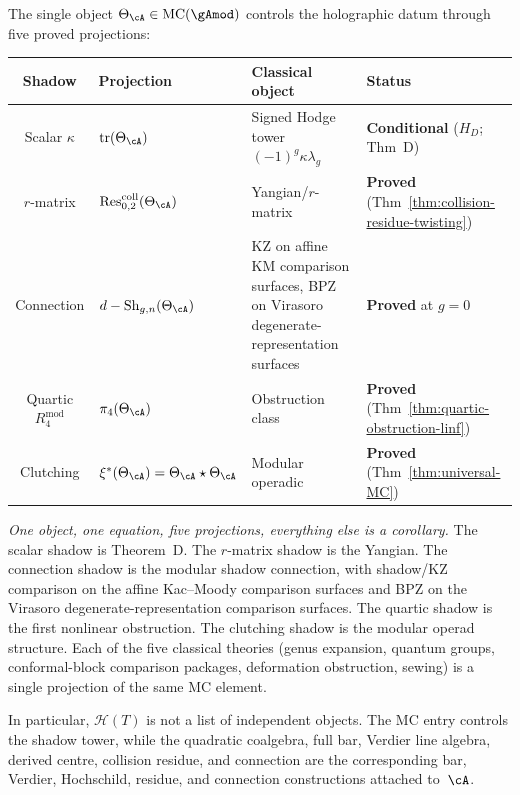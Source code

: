 \begin{remark}

\label{rem:five-shadows-synthesis}
The single object $\Theta_\cA \in \mathrm{MC}(\gAmod)$ controls the
holographic datum through five proved projections:
\begin{center}
\renewcommand{\arraystretch}{1.3}
\begin{tabular}{@{}clll@{}}
\toprule
\textbf{Shadow} & \textbf{Projection} & \textbf{Classical object}
 & \textbf{Status} \\
\midrule
Scalar $\kappa$ & $\operatorname{tr}(\Theta_\cA)$
 & Signed Hodge tower $(-1)^g\kappa\lambda_g$
 & \textbf{Conditional} ($H_D$; Thm~D) \\
$r$-matrix & $\operatorname{Res}^{\mathrm{coll}}_{0,2}(\Theta_\cA)$
 & Yangian/$r$-matrix
 & \textbf{Proved} (Thm~\ref{thm:collision-residue-twisting}) \\
Connection & $d - \operatorname{Sh}_{g,n}(\Theta_\cA)$
 & KZ on affine KM comparison surfaces,
 BPZ on Virasoro degenerate-representation surfaces
 & \textbf{Proved} at $g{=}0$ \\
Quartic $R^{\mathrm{mod}}_4$ & $\pi_4(\Theta_\cA)$
 & Obstruction class
 & \textbf{Proved}
 (Thm~\ref{thm:quartic-obstruction-linf}) \\
Clutching & $\xi^*(\Theta_\cA) = \Theta_\cA \star \Theta_\cA$
 & Modular operadic
 & \textbf{Proved} (Thm~\ref{thm:universal-MC}) \\
\bottomrule
\end{tabular}
\end{center}
\emph{One object, one equation, five projections, everything else is
a corollary.} The scalar shadow is Theorem~D\@. The $r$-matrix
shadow is the Yangian. The connection shadow is the modular
shadow connection, with shadow/KZ comparison on the affine Kac--Moody
comparison surfaces and BPZ on the Virasoro degenerate-representation
comparison surfaces. The
quartic shadow is the first nonlinear obstruction. The clutching
shadow is the modular operad structure. Each of the five classical
theories (genus expansion, quantum groups, conformal-block
comparison packages,
deformation obstruction, sewing) is a single projection of the same
MC element.

In particular, $\mathcal{H}(T)$ is not a list of independent objects.
The MC entry controls the shadow tower, while the quadratic coalgebra,
full bar,
Verdier line algebra, derived centre, collision residue, and connection
are the corresponding bar, Verdier, Hochschild, residue, and connection
constructions attached to~$\cA$.
\end{remark}

